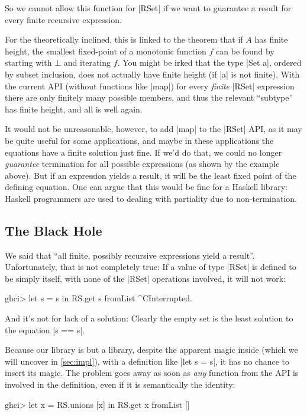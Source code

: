 \documentclass[manuscript,screen,acmsmall,nonacm]{acmart}
\begin{document}
So we cannot allow this function for |RSet| if we want to guarantee a result for every finite recursive expression.

For the theoretically inclined, this is linked to the theorem that if $A$ has finite height, the smallest fixed-point of a monotonic function $f$ can be found by starting with $\bot$ and iterating $f$.
You might be irked that the type |Set a|, ordered by subset inclusion, does not actually have finite height (if |a| is not finite). With the current API (without functions like |map|) for every \emph{finite} |RSet| expression there are only finitely many possible members, and thus the relevant “subtype” has finite height, and all is well again.

It would not be unreasonable, however, to add |map| to the |RSet| API, as it may be quite useful for some applications, and maybe in these applications the equations have a finite solution just fine. If we'd do that, we could no longer \emph{guarantee} termination for all possible expressions (as shown by the example above). But if an expression yields a result, it will be the least fixed point of the defining equation. One can argue that this would be fine for a Haskell library: Haskell programmers are used to dealing with partiality due to non-termination.

\subsection{The Black Hole}\label{sec:blackhole}

We said that “all finite, possibly recursive expressions yield a result”. Unfortunately, that is not completely true: If a value of type |RSet| is defined to be simply itself, with none of the |RSet| operations involved, it will not work:
\begin{code}
ghci> let s = s in RS.get s
fromList ^CInterrupted.
\end{code}
And it’s not for lack of a solution: Clearly the empty set is the least solution to the equation |s == s|.

Because our library is but a library, despite the apparent magic inside (which we will uncover in \cref{sec:impl}), with a definition like |let s = s|, it has no chance to insert its magic.
The problem goes away as soon as \emph{any} function from the API is involved in the definition, even if it is semantically the identity:
\begin{code}
ghci> let x = RS.unions [x] in RS.get x
fromList []
\end{code}
\end{document}

